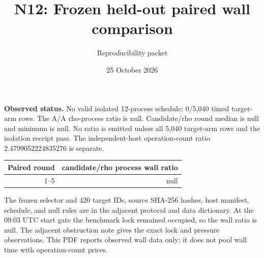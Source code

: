 \documentclass[10pt]{article}
\title{N12: Frozen held-out paired wall comparison}
\author{Reproducibility packet}
\date{25 October 2026}
\begin{document}
\maketitle
\noindent\textbf{Observed status.} No valid isolated 12-process schedule; 0/5,040 timed target-arm rows. The A/A rho-process ratio is null. Candidate/rho round median is null and minimum is null. No ratio is emitted unless all 5,040 target-arm rows and the isolation receipt pass. The independent-host operation-count ratio 2.4799052224835276 is separate.
\begin{center}
\begin{tabular}{rr}\toprule Paired round & candidate/rho process wall ratio \\ \midrule
1--5 & null \\
\bottomrule\end{tabular}
\end{center}
\begin{center}
\end{center}
\noindent The frozen selector and 420 target IDs, source SHA-256 hashes, host manifest, schedule, and null rules are in the adjacent protocol and data dictionary. At the 09:03 UTC start gate the benchmark lock remained occupied, so the wall ratio is null. The adjacent obstruction note gives the exact lock and pressure observations. This PDF reports observed wall data only; it does not pool wall time with operation-count prices.
\end{document}
